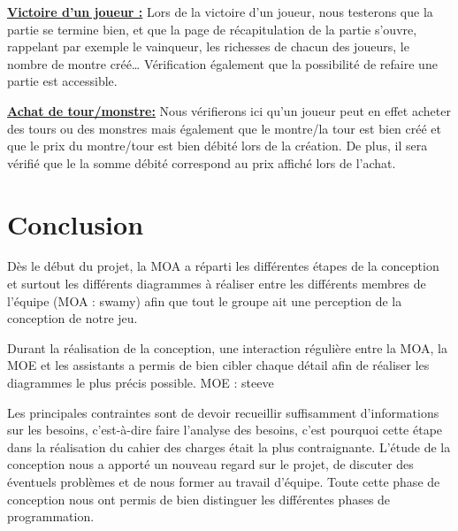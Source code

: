 \documentclass[12pt, letterpaper]{article}
\begin{document}
{\textbf{\underline{Victoire d’un joueur :}} \newline
Lors de la victoire d’un joueur, nous testerons que la partie se termine bien, et que la page de récapitulation de la partie s’ouvre, rappelant par exemple le vainqueur, les richesses de chacun des joueurs, le nombre de montre créé… Vérification également que la possibilité de refaire une partie est accessible.

\textbf{\underline{Achat de tour/monstre:}} \newline
Nous vérifierons ici qu’un joueur peut en effet acheter des tours ou des monstres mais également que le montre/la tour est bien créé et que le prix du montre/tour est bien débité lors de la création. De plus, il sera vérifié que le la somme débité correspond au prix affiché lors de l’achat.

\section{Conclusion}
Dès le début du projet, la MOA a réparti les différentes étapes de la conception et surtout les différents diagrammes à réaliser entre les différents membres de l’équipe (MOA : swamy) afin que tout le groupe ait une perception de la conception de notre jeu.

Durant la réalisation de la conception, une interaction régulière entre la MOA, la MOE et les assistants a permis de bien cibler chaque détail afin de réaliser les diagrammes le plus précis possible.
MOE : steeve

Les principales contraintes sont de devoir recueillir suffisamment d’informations sur les besoins, c’est-à-dire faire l’analyse des besoins, c’est pourquoi cette étape dans la réalisation du cahier des charges était la plus contraignante. L’étude de la conception nous a apporté un nouveau regard sur le projet, de discuter des éventuels problèmes et de nous former au travail d’équipe.
Toute cette phase de conception nous ont permis de bien distinguer les différentes phases de programmation.

\clearpage
\BgThispage

}
\end{document}
